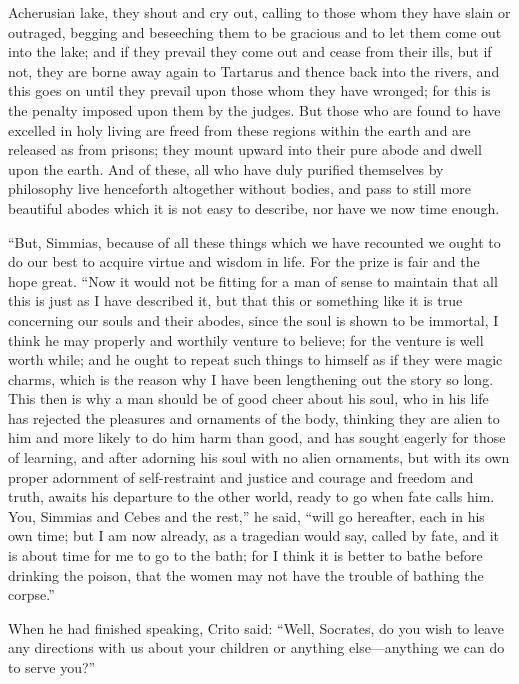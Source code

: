 \documentclass[letterpaper,12pt]{article}
\newcommand{\stephpag}[1]{\marginnote{\small\itshape\fontfamily{ppl}\selectfont #1}}
\begin{document}
\begin{drama}
Acherusian lake, they shout and cry out, calling to those whom they have slain or outraged, begging and beseeching them \stephpag{b} to be gracious and to let them come out into the lake; and if they prevail they come out and cease from their ills, but if not, they are borne away again to Tartarus and thence back into the rivers, and this goes on until they prevail upon those whom they have wronged; for this is the penalty imposed upon them by the judges. But those who are found to have excelled in holy living are freed from these regions within the earth and are released as from prisons; \stephpag{c} they mount upward into their pure abode and dwell upon the earth. And of these, all who have duly purified themselves by philosophy live henceforth altogether without bodies, and pass to still more beautiful abodes which it is not easy to describe, nor have we now time enough.
 
``But, Simmias, because of all these things which we have recounted we ought to do our best to acquire virtue and wisdom in life. For the prize is fair and the hope great. \stephpag{d} ``Now it would not be fitting for a man of sense to maintain that all this is just as I have described it, but that this or something like it is true concerning our souls and their abodes, since the soul is shown to be immortal, I think he may properly and worthily venture to believe; for the venture is well worth while; and he ought to repeat such things to himself as if they were magic charms, which is the reason why I have been lengthening out the story so long. This then is why a man should be of good cheer about his soul, who in his life \stephpag{e} has rejected the pleasures and ornaments of the body, thinking they are alien to him and more likely to do him harm than good, and has sought eagerly for those of learning, and after adorning his soul with no alien ornaments, but with its own proper adornment of self-restraint and justice and \stephpag{115 a} courage and freedom and truth, awaits his departure to the other world, ready to go when fate calls him. You, Simmias and Cebes and the rest,'' he said, ``will go hereafter, each in his own time; but I am now already, as a tragedian would say, called by fate, and it is about time for me to go to the bath; for I think it is better to bathe before drinking the poison, that the women may not have the trouble of bathing the corpse.''
 
When he had finished speaking, Crito said: \stephpag{b} ``Well, Socrates, do you wish to leave any directions with us about your children or anything else---anything we can do to serve you?''
 

\end{drama}
\end{document}
